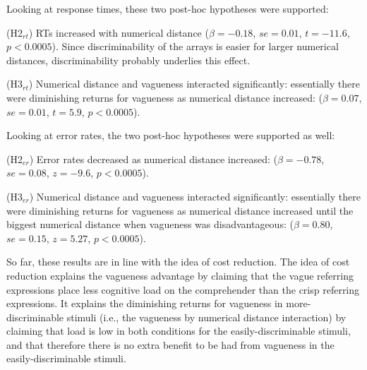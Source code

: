 \documentclass[%
man,		%
floatsintext,%
apacite%
]{apa6} %
\begin{document}
Looking at response times, these two post-hoc hypotheses were supported:

{\small
\begin{APAenumerate}
	\item [(H2$_{rt}$)] RTs increased with numerical distance 
	($\beta=-0.18$, $se=0.01$, $t=-11.6$, $p<0.0005$). %
	Since discriminability of the arrays is easier for larger numerical distances, discriminability probably underlies this effect. 
	\item [(H3$_{rt}$)] Numerical distance and vagueness interacted significantly: essentially there were diminishing returns for vagueness as numerical distance increased: 
	($\beta=0.07$, $se=0.01$, $t=5.9$, $p<0.0005$). %
\end{APAenumerate}
}

Looking at error rates, the two post-hoc hypotheses were supported as well:

{\small
\begin{APAenumerate}
	\item [(H2$_{er}$)] Error rates decreased as numerical distance increased: 
	($\beta=-0.78$, $se=0.08$, $z=-9.6$, $p<0.0005$).%
	\item [(H3$_{er}$)] Numerical distance and vagueness interacted significantly: essentially there were diminishing returns for vagueness as numerical distance increased until the biggest numerical distance when vagueness was disadvantageous: 
	($\beta=0.80$, $se=0.15$, $z=5.27$, $p<0.0005$). %
\end{APAenumerate}
}

So far, these results are in line with the idea of cost reduction. The idea of cost reduction explains the vagueness advantage by claiming that the vague referring expressions place less cognitive load on the comprehender than the crisp referring expressions. It explains the diminishing returns for vagueness in more-discriminable stimuli (i.e., the vagueness by numerical distance interaction) by claiming that load is low in both conditions for the easily-discriminable stimuli, and that therefore there is no extra benefit to be had from vagueness in the easily-discriminable stimuli.

\end{document}
